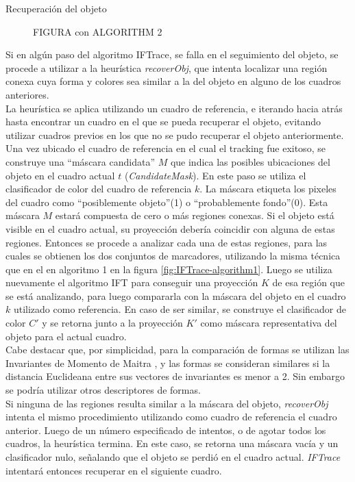 \documentclass[a4paper,10pt]{article}
\begin{document}
Recuperación del objeto\\
 \begin{figure}[H]
        \caption{FIGURA con ALGORITHM 2}
        \label{fig:IFTrace-algorithm2}
\end{figure}

Si en algún paso del algoritmo IFTrace, se falla en el seguimiento del objeto, se 
procede a utilizar a la heurística \textit{recoverObj}, que intenta localizar una
región conexa cuya forma y colores sea similar a la del objeto en alguno de los 
cuadros anteriores.\\

La heurística se aplica utilizando un cuadro de referencia, e iterando hacia atrás
hasta encontrar un cuadro en el que se pueda recuperar el objeto, evitando 
utilizar cuadros previos en los que no se pudo recuperar el objeto anteriormente.
Una vez ubicado el cuadro de referencia en el cual el tracking fue exitoso, 
se construye una ``máscara candidata'' $M$ que indica las posibles ubicaciones
del objeto en el cuadro actual $t$ (\textit{CandidateMask}). En este paso se 
utiliza el clasificador de color del cuadro de referencia $k$. La máscara 
etiqueta los pixeles del cuadro como ``posiblemente objeto''(1) o 
``probablemente fondo''(0). Esta máscara $M$ estará compuesta de cero
o más regiones conexas. Si el objeto está visible en el cuadro actual, 
su proyección debería coincidir con alguna de estas regiones. Entonces 
se procede a analizar cada una de estas regiones, para las cuales se obtienen
los dos conjuntos de marcadores, utilizando la misma técnica que en el
en algoritmo 1 en la figura \ref{fig:IFTrace-algorithm1}. Luego se utiliza 
nuevamente el algoritmo IFT para conseguir una proyección $K$ de esa región que 
se está analizando, para luego compararla con la máscara del objeto en el cuadro
$k$ utilizado como referencia. En caso de ser similar, se construye el clasificador
de color $C'$ y se retorna junto a la proyección $K'$ como máscara representativa 
del objeto para el actual cuadro. \\
Cabe destacar que, por simplicidad, para la comparación de formas se utilizan
las Invariantes de Momento de Maitra \cite{MaitraMomentInvariants}, y las formas se consideran similares
si la distancia Euclideana entre sus vectores de invariantes es menor a 2. 
Sin embargo se podría utilizar otros descriptores de formas.\\
Si ninguna de las regiones resulta similar a la máscara del objeto, 
\textit{recoverObj} intenta el mismo procedimiento utilizando como cuadro de 
referencia el cuadro anterior. Luego de un número especificado de intentos, o
de agotar todos los cuadros, la heurística termina. En este caso, se retorna
una máscara vacía y un clasificador nulo, señalando que el objeto se perdió en
el cuadro actual. \textit{IFTrace} intentará entonces recuperar en el siguiente 
cuadro.
\end{document}
